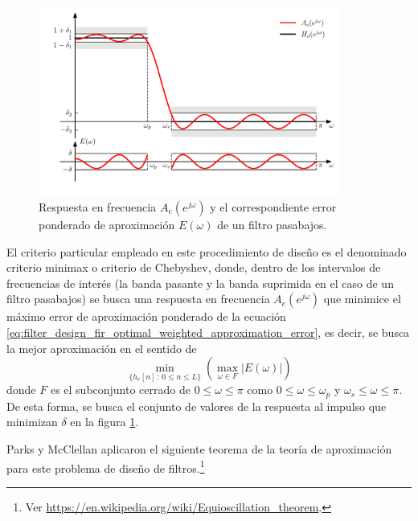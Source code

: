 \documentclass[a4paper]{report}
\begin{document}
\begin{figure}[!htb]
 \begin{center}
 \includegraphics[width=0.88\textwidth]{figuras/filter_design_fir_optimal_pm_approximation_error.pdf}
 \caption{\label{fig:filter_design_fir_optimal_pm_approximation_error} Respuesta en frecuencia \(A_e(e^{j\omega})\) y el correspondiente error ponderado de aproximación \(E(\omega)\) de un filtro pasabajos.}
 \end{center}
\end{figure}

El criterio particular empleado en este procedimiento de diseño es el denominado criterio minimax o criterio de Chebyshev, donde, dentro de los intervalos de frecuencias de interés (la banda pasante y la banda suprimida en el caso de un filtro pasabajos) se busca una respuesta en frecuencia \(A_e(e^{j\omega})\) que minimice el máximo error de aproximación ponderado de la ecuación \ref{eq:filter_design_fir_optimal_weighted_approximation_error}, es decir, se busca la mejor aproximación en el sentido de 
\[
 \min_{\{h_e[n]\,:\,0\leq n\leq L\}}\left(\max_{\omega\in F}|E(\omega)|\right)
\]
donde \(F\) es el subconjunto cerrado de \(0\leq\omega\leq\pi\) como \(0\leq\omega\leq\omega_p\) y \(\omega_s\leq\omega\leq\pi\). De esta forma, se busca el conjunto de valores de la respuesta al impulso que minimizan \(\delta\) en la figura \ref{fig:filter_design_fir_optimal_pm_approximation_error}. 

Parks y McClellan aplicaron el siguiente teorema de la teoría de aproximación para este problema de diseño de filtros.\footnote{Ver \url{https://en.wikipedia.org/wiki/Equioscillation_theorem}.}
\end{document}
